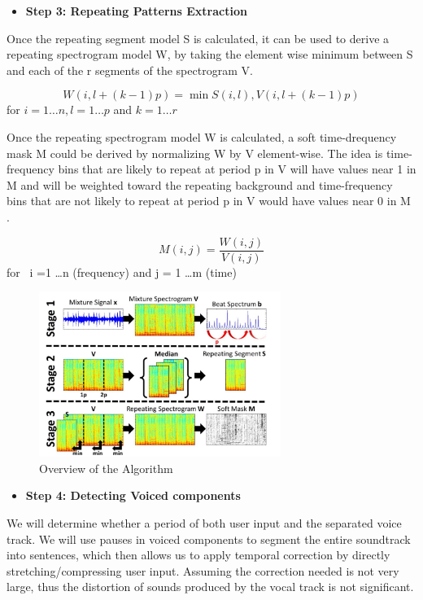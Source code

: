\documentclass[journal,onecolumn, draftclsnofoot, 12pt]{IEEEtran}
\begin{document}
\vspace{0.5cm}
\begin{itemize}
    \item \textbf{Step 3: Repeating Patterns Extraction} 
\end{itemize}
\begin{description}
   Once the repeating segment model S is calculated, it can be used to derive a repeating spectrogram model W, by taking the element wise minimum between S and each of the r segments of the spectrogram V. 
\end{description}


    \[W(i,l+(k-1)p) = \min{S(i,l),V(i,l+(k-1)p)}\]
    for \(i = 1 \dots n, l = 1 \dots p\) and \(k = 1 \dots r\)

\begin{description}
   Once the repeating spectrogram model W is calculated, a soft time-drequency mask M could be derived by normalizing W by V element-wise. The idea is time-frequency bins that are likely to repeat at period p in V will have values near 1 in M and will be weighted toward the repeating background and time-frequency bins that are not likely to repeat at period p in V would have values near 0 in M .
\end{description}
    \[M(i,j) = \frac{W(i,j)}{V(i,j)}\]
    for \ i =1 \dots n (frequency) and j = 1 \dots m (time)






\begin{figure}[ht]
\centering
\includegraphics[width=0.7\textwidth]{Figure1.png}
    \caption{ Overview of the  Algorithm  } 

\end{figure}

\vspace{0.5cm}
\begin{itemize}
    \item \textbf{Step 4: Detecting Voiced components} 
\end{itemize}
\begin{description}
   We will determine whether a period of both user input and the separated voice track. We will use pauses in voiced components to segment the entire soundtrack into sentences, which then allows us to apply temporal correction by directly stretching/compressing user input. Assuming the correction needed is not very large, thus the distortion of sounds produced by the vocal track is not significant.
\end{description}
\end{document}
